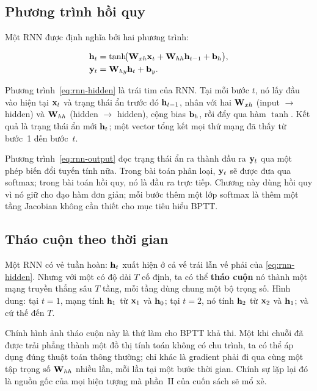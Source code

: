 \subsection{Phương trình hồi quy}

Một RNN được định nghĩa bởi hai phương trình:

\begin{align}
  \mathbf{h}_t &= \tanh\!\bigl(\mathbf{W}_{xh} \mathbf{x}_t
               + \mathbf{W}_{hh} \mathbf{h}_{t-1}
               + \mathbf{b}_h\bigr), \label{eq:rnn-hidden} \\
  \mathbf{y}_t &= \mathbf{W}_{hy} \mathbf{h}_t + \mathbf{b}_y. \label{eq:rnn-output}
\end{align}

Phương trình~\eqref{eq:rnn-hidden} là trái tim của RNN. Tại mỗi bước $t$, nó
lấy đầu vào hiện tại $\mathbf{x}_t$ và trạng thái ẩn trước đó $\mathbf{h}_{t-1}$,
nhân với hai  $\mathbf{W}_{xh}$ (input
$\to$ hidden) và $\mathbf{W}_{hh}$ (hidden $\to$ hidden), cộng
bias $\mathbf{b}_h$, rồi đẩy qua hàm $\tanh$. Kết quả là trạng thái
ẩn mới $\mathbf{h}_t$; một vector tổng kết mọi thứ mạng đã thấy từ bước~1 đến
bước~$t$.

Phương trình~\eqref{eq:rnn-output} đọc trạng thái ẩn ra thành đầu ra
$\mathbf{y}_t$ qua một phép biến đổi tuyến tính nữa. Trong bài toán phân loại,
$\mathbf{y}_t$ sẽ được đưa qua softmax; trong bài toán hồi quy, nó là đầu ra
trực tiếp. Chương này dùng hồi quy vì nó giữ cho đạo hàm đơn giản; mỗi bước
thêm một lớp softmax là thêm một tầng Jacobian không cần thiết cho mục tiêu
hiểu BPTT.

\subsection{Tháo cuộn theo thời gian}

Một RNN có vẻ tuần hoàn: $\mathbf{h}_t$ xuất hiện ở cả vế trái lẫn vế phải của
\eqref{eq:rnn-hidden}. Nhưng với một  có độ dài $T$ cố
định, ta có thể
\textbf{tháo cuộn} nó thành một mạng truyền thẳng sâu $T$ tầng, mỗi tầng dùng
chung một bộ trọng số. Hình dung: tại $t=1$, mạng tính $\mathbf{h}_1$ từ
$\mathbf{x}_1$ và $\mathbf{h}_0$; tại $t=2$, nó tính $\mathbf{h}_2$ từ $\mathbf{x}_2$
và $\mathbf{h}_1$; và cứ thế đến $T$.

Chính hình ảnh tháo cuộn này là thứ làm cho BPTT khả thi. Một khi chuỗi đã
được trải phẳng thành một đồ thị tính toán không có chu trình, ta có thể áp
dụng đúng thuật toán  thông thường; chỉ
khác là gradient
phải đi qua cùng một tập trọng số $\mathbf{W}_{hh}$ nhiều lần, mỗi lần tại một
bước thời gian. Chính sự lặp lại đó là nguồn gốc của mọi hiện tượng mà phần~II
của cuốn sách sẽ mổ xẻ.

